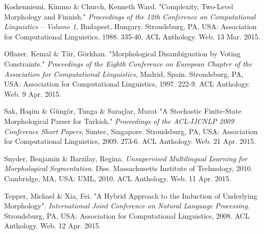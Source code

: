 \documentclass[12pt]{article}
\begin{document}
\begin{thebibliography}{9}
Koskenniemi, Kimmo \& Church, Kenneth Ward.
"Complexity, Two-Level Morphology and Finnish."
\textit{Proceedings of the 12th Conference on Computational Linguistics -- Volume 1},
Budapest, Hungary.
Stroudsburg, PA, USA:
Association for Computational Linguistics, 1988.
335-40.
ACL Anthology.
Web.
13 Mar. 2015.

Oflazer, Kemal \& T{\"u}r, G{\"o}rkhan.
"Morphological Disambiguation by Voting Constraints."
\textit{Proceedings of the Eighth Conference on European Chapter of the Association for Computational Linguistics},
Madrid, Spain.
Stroudsburg, PA, USA:
Association for Computational Linguistics, 1997.
222-9.
ACL Anthology.
Web.
9 Apr. 2015.

Sak, Ha\c{s}im \& G\"{u}ng\"{o}r, Tunga \& Sara\c{c}lar, Murat
"A Stochastic Finite-State Morphological Parser for Turkish."
\textit{Proceedings of the ACL-IJCNLP 2009 Conference Short Papers},
Suntec, Singapore.
Stroudsburg, PA, USA:
Association for Computational Linguistics, 2009.
273-6.
ACL Anthology.
Web.
21 Apr. 2015.

Snyder, Benjamin \& Barzilay, Regina.
\textit{Unsupervised Multilingual Learning for Morphological Segmentation}.
Diss.
Massachusetts Institute of Technology, 2010.
Cambridge, MA, USA: UML, 2010.
ACL Anthology.
Web.
11 Apr. 2015.

Tepper, Michael \& Xia, Fei.
"A Hybrid Approach to the Induction of Underlying Morphology".
\textit{International Joint Conference on Natural Language Processing}.
Stroudsburg, PA, USA:
Association for Computational Linguistics, 2008.
ACL Anthology.
Web.
12 Apr. 2015.

\end{thebibliography}
\end{document}
